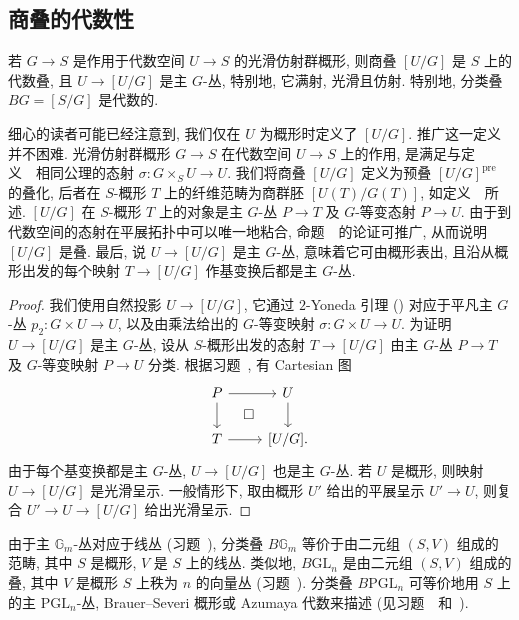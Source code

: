 \subsection{商叠的代数性}\label{src:4.1.4-subsection}
\begin{theorem}[商叠的代数性]\label{src:4.1.10}
若 $G\to S$ 是作用于代数空间 $U\to S$ 的光滑仿射群概形, 则商叠 $[U/G]$ 是 $S$ 上的代数叠, 且 $U\to[U/G]$ 是主 $G$-丛, 特别地, 它满射, 光滑且仿射. 特别地, 分类叠 $BG=[S/G]$ 是代数的.
\end{theorem}
\begin{remark}\label{src:4.1.11}
细心的读者可能已经注意到, 我们仅在 $U$ 为概形时定义了 $[U/G]$. 推广这一定义并不困难. 光滑仿射群概形 $G\to S$ 在代数空间 $U\to S$ 上的作用, 是满足与定义~~相同公理的态射 $\sigma:G\times_S U\to U$.
我们将商叠 $[U/G]$ 定义为预叠 $[U/G]^{\mathrm{pre}}$ 的叠化, 后者在 $S$-概形 $T$ 上的纤维范畴为商群胚 $[U(T)/G(T)]$, 如定义~~所述.
$[U/G]$ 在 $S$-概形 $T$ 上的对象是主 $G$-丛 $P\to T$ 及 $G$-等变态射 $P\to U$. 由于到代数空间的态射在平展拓扑中可以唯一地粘合, 命题~~的论证可推广, 从而说明 $[U/G]$ 是叠.
最后, 说 $U\to[U/G]$ 是主 $G$-丛, 意味着它可由概形表出, 且沿从概形出发的每个映射 $T\to[U/G]$ 作基变换后都是主 $G$-丛.
\end{remark}
\begin{proof}
我们使用自然投影 $U\to[U/G]$, 它通过 $2$-Yoneda 引理 () 对应于平凡主 $G$-丛 $p_2:G\times U\to U$, 以及由乘法给出的 $G$-等变映射 $\sigma:G\times U\to U$.
为证明 $U\to[U/G]$ 是主 $G$-丛, 设从 $S$-概形出发的态射 $T\to[U/G]$ 由主 $G$-丛 $P\to T$ 及 $G$-等变映射 $P\to U$ 分类. 根据习题~, 有 Cartesian 图
\[
\begin{tikzcd}
P\arrow[r]\arrow[d]\arrow[dr,phantom,"\square"]&U\arrow[d]\\
T\arrow[r]&{[U/G]}.
\end{tikzcd}
\]
由于每个基变换都是主 $G$-丛, $U\to[U/G]$ 也是主 $G$-丛. 若 $U$ 是概形, 则映射 $U\to[U/G]$ 是光滑呈示. 一般情形下, 取由概形 $U'$ 给出的平展呈示 $U'\to U$, 则复合 $U'\to U\to[U/G]$ 给出光滑呈示.
\end{proof}
\begin{example}\label{src:4.1.12}
由于主 $\mathbb G_m$-丛对应于线丛 (习题~), 分类叠 $B\mathbb G_m$ 等价于由二元组 $(S,V)$ 组成的范畴, 其中 $S$ 是概形, $V$ 是 $S$ 上的线丛. 类似地, $B\mathrm{GL}_n$ 是由二元组 $(S,V)$ 组成的叠, 其中 $V$ 是概形 $S$ 上秩为 $n$ 的向量丛 (习题~).
分类叠 $B\mathrm{PGL}_n$ 可等价地用 $S$ 上的主 $\mathrm{PGL}_n$-丛, Brauer--Severi 概形或 Azumaya 代数来描述 (见习题~~和~).
\end{example}
